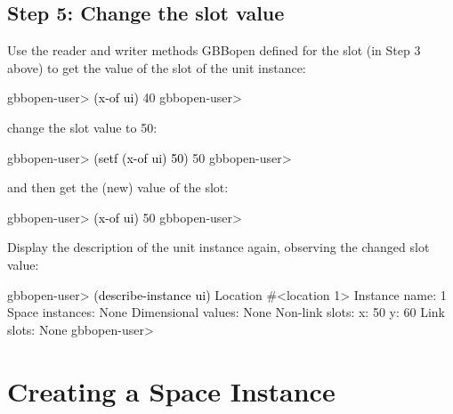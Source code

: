 \documentclass[10pt,twoside,english,pdftex]{article}
\begin{document}
\subsection*{Step 5: Change the  slot value}

%
%
%
%
%
%
%
%
Use the  reader and writer methods GBBopen defined for the 
slot (in Step 3 above) to get the value of the  slot of the unit
instance:
%
\W\supp
\begin{example}
\textcolor{darkergray}{%
  gbbopen-user> \textcolor{black}{(x-of ui)}
  40
  gbbopen-user>}
\end{example}
%
change the slot value to 50:
%
\W\supp\notpretop
\begin{example}
\textcolor{darkergray}{%
  gbbopen-user> \textcolor{black}{(setf (x-of ui) 50)}
  50
  gbbopen-user>}
\end{example}
%
and then get the (new) value of the  slot:
%
\W\supp\notpretop
\begin{example}
\textcolor{darkergray}{%
  gbbopen-user> \textcolor{black}{(x-of ui)}
  50
  gbbopen-user>}
\end{example}

%
Display the description of the  unit instance again, observing the
changed  slot value:
%
\begin{example}
\W\supp
\textcolor{darkergray}{%
  gbbopen-user> \textcolor{black}{(describe-instance ui)}
  Location #<location 1>
    Instance name: 1
    Space instances: None
    Dimensional values: None
    Non-link slots:
      x:  50
      y:  60
    Link slots: None
  gbbopen-user>}
\end{example}


\T\markright{}%
\T\pagestyle{plain}
\T\cleardoublepage
\W{}
\T\pagestyle{fancy}
\T\thispagestyle{fancybottom}
\T\renewcommand{\headrulewidth}{0pt}
\section{Creating a Space Instance}
\label{sec:space-instance}%
\end{document}
